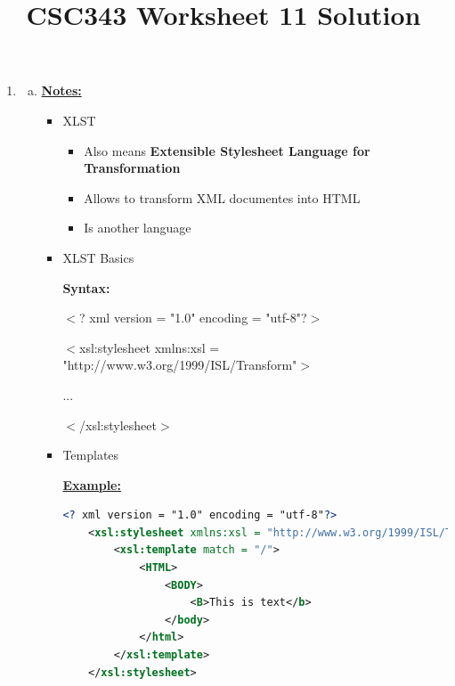 \documentclass[12pt]{article}
\begin{document}
\title{CSC343 Worksheet 11 Solution}
\maketitle

\begin{enumerate}[1.]
    \item

    \begin{enumerate}[a)]
        \item

        \bigskip

        \underline{\textbf{Notes:}}

        \bigskip

        \begin{itemize}
            \item XLST
            \begin{itemize}
                \item Also means \textbf{Extensible Stylesheet Language for Transformation}
                \item Allows to transform XML documentes into HTML
                \item Is another language
            \end{itemize}
            \item XLST Basics

            \bigskip

            \textbf{Syntax:}

            \bigskip

            $<$? xml version = "1.0" encoding = "utf-8"?$>$

            $<$xsl:stylesheet xmlns:xsl = "http://www.w3.org/1999/ISL/Transform"$>$

            \quad...

            $<$/xsl:stylesheet$>$


            \item Templates

            \bigskip

            \underline{\textbf{Example:}}

    \begin{lstlisting}[language=XML]
    <? xml version = "1.0" encoding = "utf-8"?>
    <xsl:stylesheet xmlns:xsl = "http://www.w3.org/1999/ISL/Transform">
        <xsl:template match = "/">
            <HTML>
                <BODY>
                    <B>This is text</b>
                </body>
            </html>
        </xsl:template>
    </xsl:stylesheet>
    \end{lstlisting}


\end{itemize}
\end{enumerate}
\end{enumerate}
\end{document}
